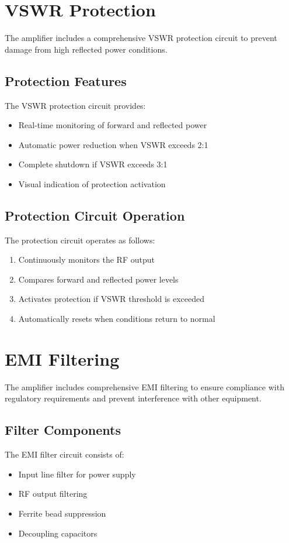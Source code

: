 \documentclass[11pt,a4paper]{article}
\begin{document}
\section{VSWR Protection}
\label{sec:vswr_protection}

The amplifier includes a comprehensive VSWR protection circuit to prevent damage from high reflected power conditions.

\subsection{Protection Features}
The VSWR protection circuit provides:
\begin{itemize}
    \item Real-time monitoring of forward and reflected power
    \item Automatic power reduction when VSWR exceeds 2:1
    \item Complete shutdown if VSWR exceeds 3:1
    \item Visual indication of protection activation
\end{itemize}

\subsection{Protection Circuit Operation}
The protection circuit operates as follows:
\begin{enumerate}
    \item Continuously monitors the RF output
    \item Compares forward and reflected power levels
    \item Activates protection if VSWR threshold is exceeded
    \item Automatically resets when conditions return to normal
\end{enumerate}

\section{EMI Filtering}
\label{sec:emi_filtering}

The amplifier includes comprehensive EMI filtering to ensure compliance with regulatory requirements and prevent interference with other equipment.

\subsection{Filter Components}
The EMI filter circuit consists of:
\begin{itemize}
    \item Input line filter for power supply
    \item RF output filtering
    \item Ferrite bead suppression
    \item Decoupling capacitors
\end{itemize}
\end{document}
